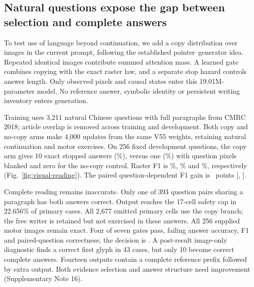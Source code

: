 \subsection*{Natural questions expose the gap between selection and complete answers}
To test use of language beyond continuation, we add a copy distribution over
images in the current prompt, following the established pointer--generator
idea\cite{pointer}. Repeated identical images contribute summed attention
mass. A learned gate combines copying with the exact raster law, and a
separate stop hazard controls answer length. Only observed pixels and causal
states enter this 19.01M-parameter model. No reference answer, symbolic
identity or persistent writing inventory enters generation.

Training uses 3,211 natural Chinese questions with full paragraphs from
CMRC 2018\cite{cmrc}; article overlap is removed across training and development.
Both copy and no-copy arms make 4,000 updates from the same V55 weights,
retaining natural continuation and motor exercises. On 256 fixed development
questions, the copy arm gives 10 exact stopped answers (\QaExact\%), versus
one (\QaBlankExact\%) with question pixels blanked and zero for the no-copy
control. Raster F1 is \QaFone\%, \QaBlankFone\% and \QaControlFone\%,
respectively (Fig.~\ref{fig:visual-reading}). The paired question-dependent
F1 gain is \QaQuestionGain\ points [\QaQuestionLow, \QaQuestionHigh].

Complete reading remains inaccurate. Only one of 393 question pairs sharing
a paragraph has both answers correct. Output reaches the 17-cell safety cap
in 22.656\% of primary cases. All 2,677 emitted primary cells use the copy
branch; the free writer is retained but not exercised in these answers.
All 256 supplied motor images remain exact. Four of seven gates pass, failing
answer accuracy, F1 and paired-question correctness; the decision is
\texttt{\QaDecision}. A post-result image-only diagnostic finds a correct
first glyph in 43 cases, but only 10 become correct complete answers. Fourteen
outputs contain a complete reference prefix followed by extra output. Both
evidence selection and answer structure need improvement (Supplementary Note 16).


